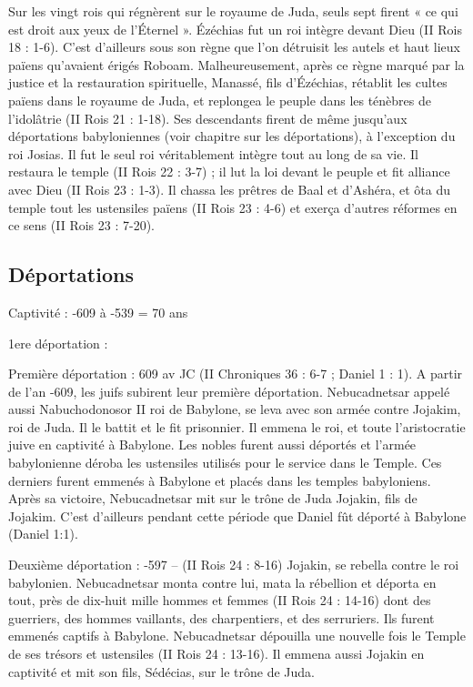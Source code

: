 Sur les vingt rois qui régnèrent sur le royaume de Juda, seuls sept firent « ce qui est droit aux yeux de l’Éternel ». Ézéchias fut un roi intègre devant Dieu (II Rois 18 : 1-6). C'est d'ailleurs sous son règne que l'on détruisit les autels et haut lieux païens qu'avaient érigés Roboam. Malheureusement, après ce règne marqué par la justice et la restauration spirituelle, Manassé, fils d’Ézéchias, rétablit les cultes païens dans le royaume de Juda, et replongea le peuple dans les ténèbres de l'idolâtrie (II Rois 21 : 1-18). Ses descendants firent de même jusqu'aux déportations babyloniennes (voir chapitre sur les déportations), à l’exception du roi Josias. Il fut le seul roi véritablement intègre tout au long de sa vie. Il restaura le temple (II Rois 22 : 3-7) ; il lut la loi devant le peuple et fit alliance avec Dieu (II Rois 23 : 1-3). Il chassa les prêtres de Baal et d'Ashéra, et ôta du temple tout les ustensiles païens (II Rois 23 : 4-6) et exerça d'autres réformes en ce sens (II Rois 23 : 7-20).

\subsection*{Déportations}

Captivité : -609 à -539 = 70 ans

1ere déportation :

Première déportation : 609 av JC (II Chroniques 36 : 6-7 ; Daniel 1 : 1).
A partir de l'an -609, les juifs subirent leur première déportation.
Nebucadnetsar appelé aussi Nabuchodonosor II roi de Babylone, se leva avec son armée contre Jojakim, roi de Juda. Il le battit et le fit prisonnier. Il emmena le roi, et toute l'aristocratie juive en captivité à Babylone. Les nobles furent aussi déportés et l'armée babylonienne déroba les ustensiles utilisés pour le service dans le Temple. Ces derniers furent emmenés à Babylone et placés dans les temples babyloniens. Après sa victoire, Nebucadnetsar mit sur le trône de Juda Jojakin, fils de Jojakim. C'est d'ailleurs pendant cette période que Daniel fût déporté à Babylone (Daniel 1:1).

Deuxième déportation : -597 – (II Rois 24 : 8-16)
Jojakin, se rebella contre le roi babylonien. Nebucadnetsar monta contre lui, mata la rébellion et déporta en tout, près de dix-huit mille hommes et femmes (II Rois 24 : 14-16) dont des guerriers, des hommes vaillants, des charpentiers, et des serruriers. Ils furent emmenés captifs à Babylone. Nebucadnetsar dépouilla une nouvelle fois le Temple de ses trésors et ustensiles (II Rois 24 : 13-16). Il emmena aussi Jojakin en captivité et mit son fils, Sédécias, sur le trône de Juda.

